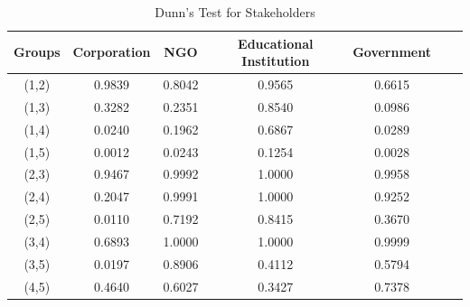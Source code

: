 \begin{table}[h!]
  \centering
  \caption{Dunn's Test for Stakeholders}
  \label{tab:dunn_stak}
  \begin{tabular}{ccccccc}
    \toprule
     Groups & Corporation & NGO & Educational Institution & Government \\
    \midrule
    (1,2) & 0.9839 & 0.8042 & 0.9565 & 0.6615 \\
    (1,3) & 0.3282 & 0.2351 & 0.8540 & 0.0986 \\
    (1,4) & 0.0240 & 0.1962 & 0.6867 & 0.0289 \\
    (1,5) & 0.0012 & 0.0243 & 0.1254 & 0.0028 \\
    (2,3) & 0.9467 & 0.9992 & 1.0000 & 0.9958 \\
    (2,4) & 0.2047 & 0.9991 & 1.0000 & 0.9252  \\
    (2,5) & 0.0110 & 0.7192 & 0.8415 & 0.3670  \\
    (3,4) & 0.6893 & 1.0000 & 1.0000 & 0.9999 \\
    (3,5) & 0.0197 & 0.8906 & 0.4112 & 0.5794  \\
    (4,5) & 0.4640 & 0.6027 & 0.3427 & 0.7378 \\
    \bottomrule
  \end{tabular}
\end{table}  


